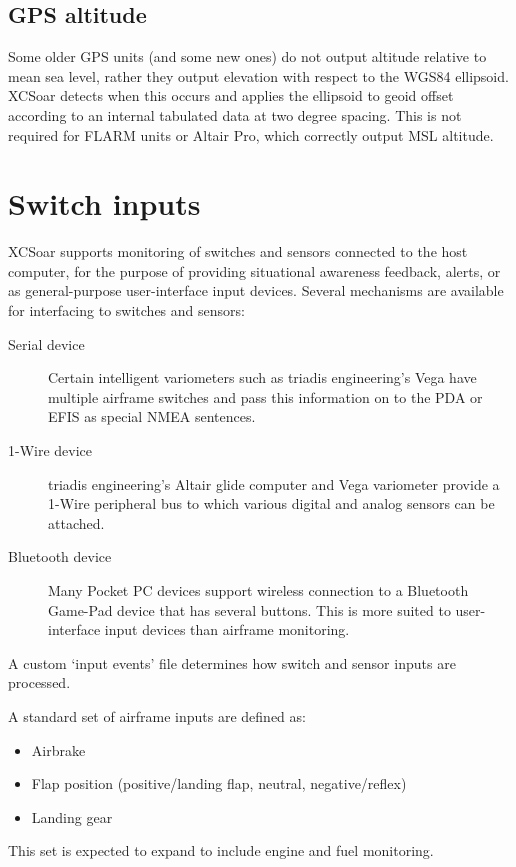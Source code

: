 \subsection*{GPS altitude}

Some older GPS units (and some new ones) do not output altitude
relative to mean sea level, rather they output elevation with respect
to the WGS84 ellipsoid.  XCSoar detects when this occurs and applies
the ellipsoid to geoid offset according to an internal tabulated data
at two degree spacing.  This is not required for FLARM units or Altair
Pro, which correctly output MSL altitude.

\section{Switch inputs}

XCSoar supports monitoring of switches and sensors connected to the
host computer, for the purpose of providing situational awareness
feedback, alerts, or as general-purpose user-interface input devices.
Several mechanisms are available for interfacing to switches and
sensors:
\begin{description}
\item[Serial device]  Certain intelligent variometers such as
 triadis engineering's Vega have multiple airframe switches
 and pass this information on to the PDA or EFIS as special
 NMEA sentences.
\item[1-Wire device]  triadis engineering's Altair glide computer
 and Vega variometer provide a 1-Wire peripheral bus to which
 various digital and analog sensors can be attached.
\item[Bluetooth device]  Many Pocket PC devices support wireless
 connection to a Bluetooth Game-Pad device that has several buttons.
 This is more suited to user-interface input devices than airframe
 monitoring.
\end{description}

A custom `input events' file determines how switch and sensor
inputs are processed.

A standard set of airframe inputs are defined as:
\begin{itemize}
\item Airbrake
\item Flap position (positive/landing flap, neutral, negative/reflex)
\item Landing gear
\end{itemize}

This set is expected to expand to include engine and fuel monitoring.

